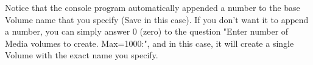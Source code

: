 Notice that the console program automatically appended a number to the base
Volume name that you specify (Save in this case). If you don't want it to
append a number, you can simply answer 0 (zero) to the question "Enter number
of Media volumes to create. Max=1000:", and in this case, it will create a
single Volume with the exact name you specify. 
